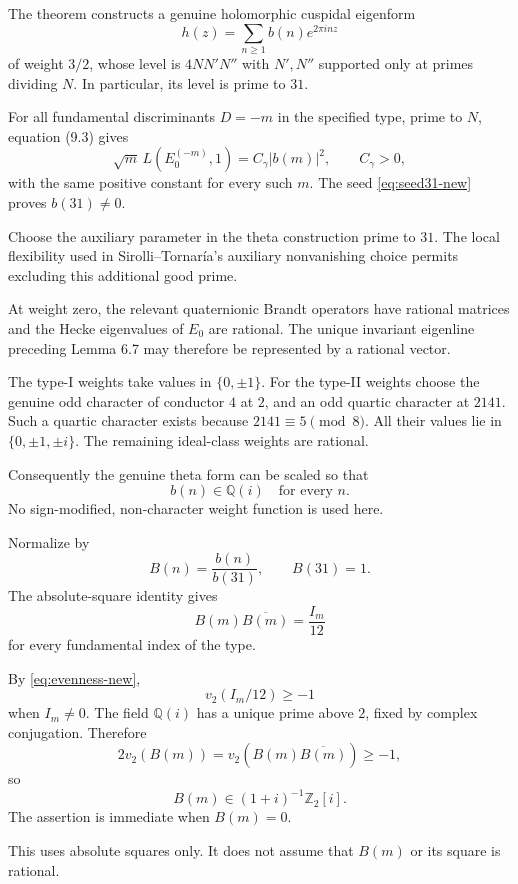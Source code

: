 \documentclass[11pt]{article}
\begin{document}
The theorem constructs a genuine
holomorphic cuspidal eigenform
\[
h(z)=\sum_{n\ge1}b(n)e^{2\pi inz}
\]
of weight $3/2$, whose level is
$4NN'N''$ with $N',N''$ supported only
at primes dividing $N$.
In particular, its level is prime to $31$.

For all fundamental discriminants
$D=-m$ in the specified type, prime to $N$,
equation (9.3) gives
\[
\sqrt m\,L(E_0^{(-m)},1)=C_\gamma|b(m)|^2,
\qquad C_\gamma>0,
\]
with the same positive constant for
every such $m$.
The seed \eqref{eq:seed31-new} proves
$b(31)\ne0$.

Choose the auxiliary parameter in the
theta construction prime to $31$.
The local flexibility used in
Sirolli--Tornar\'ia's auxiliary
nonvanishing choice permits excluding
this additional good prime.

At weight zero, the relevant quaternionic
Brandt operators have rational matrices
and the Hecke eigenvalues of $E_0$ are
rational. The unique invariant eigenline
preceding Lemma 6.7 may therefore be
represented by a rational vector.

The type-I weights take values in
$\{0,\pm1\}$.
For the type-II weights choose the genuine
odd character of conductor $4$ at $2$,
and an odd quartic character at $2141$.
Such a quartic character exists because
$2141\equiv5\pmod8$.
All their values lie in
$\{0,\pm1,\pm i\}$.
The remaining ideal-class weights are
rational.

Consequently the genuine theta form
can be scaled so that
\[
b(n)\in\mathbb Q(i)
\quad\text{for every }n.
\]
No sign-modified, non-character weight
function is used here.

Normalize by
\[
B(n)=\frac{b(n)}{b(31)},\qquad B(31)=1.
\]
The absolute-square identity gives
\begin{equation}\label{eq:absolute-new}
B(m)\overline{B(m)}=\frac{I_m}{12}
\end{equation}
for every fundamental index of the type.

By \eqref{eq:evenness-new},
\[
v_2(I_m/12)\ge-1
\]
when $I_m\ne0$.
The field $\mathbb Q(i)$ has a unique
prime above $2$, fixed by complex
conjugation. Therefore
\[
2v_2(B(m))
=v_2(B(m)\overline{B(m)})\ge-1,
\]
so
\begin{equation}\label{eq:dyadic-lattice-new}
\boxed{
B(m)\in(1+i)^{-1}\mathbb Z_2[i].
}
\end{equation}
The assertion is immediate when $B(m)=0$.

This uses absolute squares only. It does
not assume that $B(m)$ or its square is
rational.
\end{document}
